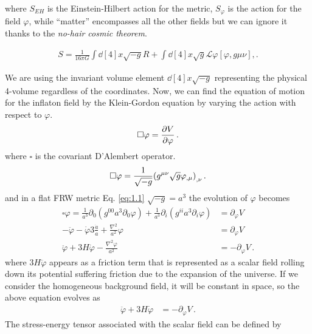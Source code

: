 where \(S_{EH}\) is the Einstein-Hilbert action for the metric, \(S_\varphi \) is the action for the field \(\varphi \), while ``matter'' encompasses all the other fields but we can ignore it thanks to the \emph{no-hair cosmic theorem}.

\begin{align}
    S = \frac{1}{16 \pi G} \int \dd[4]{x} \sqrt{-g} R + \int \dd[4]{x} \sqrt{g} \mathscr{L}\varphi [\varphi , g{\mu \nu }],. \label{2.10}
\end{align}

We are using the invariant volume element \(\dd[4]{x} \sqrt{-g}\)
representing the physical 4-volume regardless of the coordinates.
Now, we can find the equation of motion for the inflaton field by the Klein-Gordon equation by varying the action with respect to $\varphi$.
\begin{align}
    \square \varphi = \pdv{V}{\varphi }\,. \label{2.11}
\end{align}
where $\square$ is the covariant D'Alembert operator.
\begin{align}
    \square \varphi = \frac{1}{\sqrt{-g}} \qty(g^{\mu \nu } \sqrt{g} \varphi_{, \mu })_{, \nu }\,.\label{2.12}
\end{align}
and in a flat FRW metric Eq. \ref{eq:1.1} $\sqrt{-g} = a^3$ the evolution of $\varphi$ becomes
\begin{align}
    \square \varphi = \frac{1}{a^3} \partial_0 (g^{00} a^3\partial_0\varphi) + \frac{1}{a^3} \partial_i (g^{ii} a^3\partial_i\varphi) 
    &= \partial _{\varphi} V  \\ - \ddot{\varphi} - \dot{\varphi} 3\frac{\dot{a}}{a} + \frac{\nabla^2}{a^2} \varphi  
    &= \partial _{\varphi} V  \\ \ddot{\varphi} + 3 H \dot{\varphi} - \frac{\nabla^2 \varphi }{a^2} &= - \partial _{\varphi} V\,. \label{2.15}
\end{align}
where $3H\ddot{\varphi}$ appears as a friction term that is represented as a scalar field rolling down its potential suffering friction due to the expansion of the universe. If we consider the homogeneous background field, it will be constant in space, so  the above equation evolves as\\
\begin{align}
     \ddot{\varphi} + 3 H \dot{\varphi}  &= - \partial _{\varphi} V\,. \label{2.16}
\end{align}
The stress-energy tensor associated with the scalar field can be defined by 

